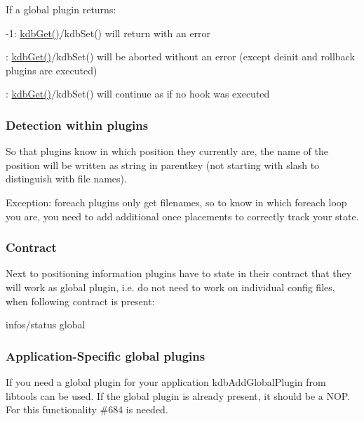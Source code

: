 If a global plugin returns\+:


\begin{DoxyItemize}
\item {\ttfamily -\/1}\+: {\ttfamily \hyperlink{group__kdb_ga28e385fd9cb7ccfe0b2f1ed2f62453a1}{kdb\+Get()}/kdb\+Set()} will return with an error
\item {}\+: {\ttfamily \hyperlink{group__kdb_ga28e385fd9cb7ccfe0b2f1ed2f62453a1}{kdb\+Get()}/kdb\+Set()} will be aborted without an error (except {\ttfamily deinit} and {\ttfamily rollback} plugins are executed)
\item {}\+: {\ttfamily \hyperlink{group__kdb_ga28e385fd9cb7ccfe0b2f1ed2f62453a1}{kdb\+Get()}/kdb\+Set()} will continue as if no hook was executed
\end{DoxyItemize}

\subsubsection*{Detection within plugins}

So that plugins know in which position they currently are, the name of the position will be written as string in parentkey (not starting with slash to distinguish with file names).

Exception\+: {\ttfamily foreach} plugins only get filenames, so to know in which foreach loop you are, you need to add additional {\ttfamily once} placements to correctly track your state.

\subsubsection*{Contract}

Next to positioning information plugins have to state in their contract that they will work as global plugin, i.\+e. do not need to work on individual config files, when following contract is present\+: \begin{DoxyVerb}infos/status global
\end{DoxyVerb}


\subsubsection*{Application-\/\+Specific global plugins}

If you need a global plugin for your application {\ttfamily kdb\+Add\+Global\+Plugin} from libtools can be used. If the global plugin is already present, it should be a N\+OP. For this functionality \#684 is needed.

